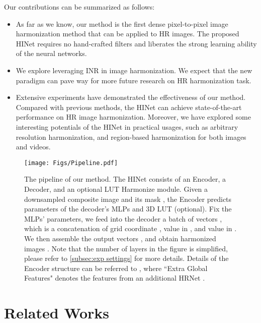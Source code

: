 \documentclass[10pt,journal,twocolumn,twoside]{IEEEtran}
\begin{document}
Our contributions can be summarized as follows:

\begin{itemize}
    \item As far as we know, our method is the first dense pixel-to-pixel image harmonization method that can be applied to HR images. The proposed HINet requires no hand-crafted filters and liberates the strong learning ability of the neural networks.
    \item We explore leveraging INR in image harmonization. We expect that the new paradigm can pave way for more future research on HR harmonization task.
    \item Extensive experiments have demonstrated the effectiveness of our method. Compared with previous methods, the HINet can achieve state-of-the-art performance on HR image harmonization. Moreover, we have explored some interesting potentials of the HINet in practical usages, such as arbitrary resolution harmonization, and region-based harmonization for both images and videos.
\end{itemize}

\begin{figure*}[t]
  \centering
   \texttt{[image: Figs/Pipeline.pdf]}
   \vspace{-3ex}
   \caption{The pipeline of our method. The HINet consists of an Encoder, a Decoder, and an optional LUT Harmonize module. Given a downsampled composite image  and its mask , the Encoder predicts parameters of the decoder's MLPs and 3D LUT (optional). Fix the MLPs' parameters, we feed into the decoder a batch of vectors , which is a concatenation of grid coordinate , value  in , and value  in . We then assemble the output vectors , and obtain harmonized images . Note that the number of layers in the figure is simplified, please refer to \cref{subsec:exp settings} for more details. Details of the Encoder structure can be referred to \cite{sofiiuk2021foreground}, where ``Extra Global Features" denotes the features from an additional HRNet \cite{wang2020deep}.}
   \label{fig:Pipeline}
\end{figure*}


\section{Related Works}
\label{sec:relate}
\end{document}
